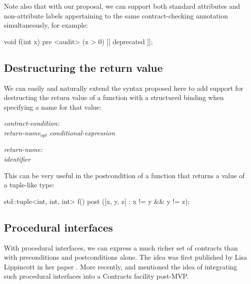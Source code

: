 Note also that with our proposal, we can support both standard attributes and non-attribute labels appertaining to the same contract-checking annotation simultaneously, for example:

\vspace{2mm}
\begin{codeblock}
void f(int x)
  pre <audit> (x > 0) [[ deprecated ]];
\end{codeblock}
\vspace{2mm}

\subsection{Destructuring the return value}
\label{subsec:struct}

We can easily and naturally extend the syntax proposed here to add support for destructing the return value of a function with a structured binding when specifying a name for that value:

\emph{contract-condition:} \\
\phantom{~~~}\tcode{(} \emph{return-name}$_{opt}$ \emph{conditional-expression} \tcode{)}

\emph{return-name:}\\
\phantom{~~~}\emph{identifier} \tcode{:} \\
\phantom{~~~}

This can be very useful in the postcondition of a function that returns a value of a tuple-like type:

\vspace{2mm}
\begin{codeblock}
std::tuple<int, int, int> f()
  post ([x, y, z] : x != y && y != z);
\end{codeblock}
\vspace{2mm}

\subsection{Procedural interfaces}
\label{subsec:interfaces}

With procedural interfaces, we can express a much richer set of contracts than with preconditions and postconditions alone. The idea was first published by Lisa Lippincott in her paper \cite{P0465R0}. More recently, \cite{P2885R2} and \cite{P2935R0} mentioned the idea of integrating such procedural interfaces into a Contracts facility post-MVP.

